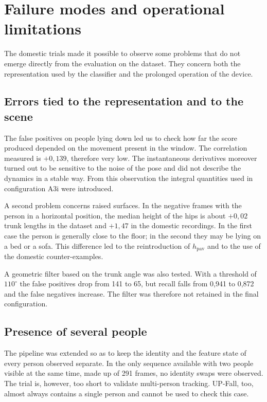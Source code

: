 \section{Failure modes and operational limitations}
\label{sec:fallimenti}
\label{sec:modi-fallire}

The domestic trials made it possible to observe some problems that do not emerge directly from the evaluation on the dataset. They concern both the representation used by the classifier and the prolonged operation of the device.

\subsection{Errors tied to the representation and to the scene}

The false positives on people lying down led us to check how far the score produced depended on the movement present in the window. The correlation measured is $+0{,}139$, therefore very low. The instantaneous derivatives moreover turned out to be sensitive to the noise of the pose and did not describe the dynamics in a stable way. From this observation the integral quantities used in configuration A3i were introduced.

A second problem concerns raised surfaces. In the negative frames with the person in a horizontal position, the median height of the hips is about $+0{,}02$ trunk lengths in the dataset and $+1{,}47$ in the domestic recordings. In the first case the person is generally close to the floor; in the second they may be lying on a bed or a sofa. This difference led to the reintroduction of $h_{\text{pav}}$ and to the use of the domestic counter-examples.

A geometric filter based on the trunk angle was also tested. With a threshold of $110^\circ$ the false positives drop from 141 to 65, but recall falls from 0,941 to 0,872 and the false negatives increase. The filter was therefore not retained in the final configuration.

\subsection{Presence of several people}

The pipeline was extended so as to keep the identity and the feature state of every person observed separate. In the only sequence available with
two people visible at the same time, made up of 291 frames, no
identity swaps were observed. The trial is, however, too short to validate multi-person tracking. UP-Fall, too, almost always contains a single person and cannot be used to check this case.

